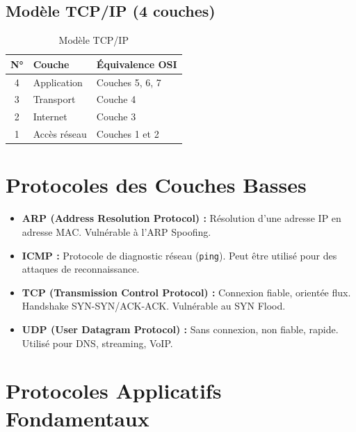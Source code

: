 \subsection{Modèle TCP/IP (4 couches)}

\begin{table}[H]
\centering
\begin{tabular}{clp{7cm}}
    \toprule
    \textbf{N°} & \textbf{Couche} & \textbf{Équivalence OSI} \\
    \midrule
    4 & Application & Couches 5, 6, 7 \\
    3 & Transport   & Couche 4 \\
    2 & Internet    & Couche 3 \\
    1 & Accès réseau & Couches 1 et 2 \\
    \bottomrule
\end{tabular}
\caption{Modèle TCP/IP}
\end{table}

\section{Protocoles des Couches Basses}

\begin{itemize}
    \item \textbf{ARP (Address Resolution Protocol) :} Résolution d'une adresse IP en adresse MAC. Vulnérable à l'ARP Spoofing.
    \item \textbf{ICMP :} Protocole de diagnostic réseau (\texttt{ping}). Peut être utilisé pour des attaques de reconnaissance.
    \item \textbf{TCP (Transmission Control Protocol) :} Connexion fiable, orientée flux. Handshake SYN-SYN/ACK-ACK. Vulnérable au SYN Flood.
    \item \textbf{UDP (User Datagram Protocol) :} Sans connexion, non fiable, rapide. Utilisé pour DNS, streaming, VoIP.
\end{itemize}

\section{Protocoles Applicatifs Fondamentaux}

